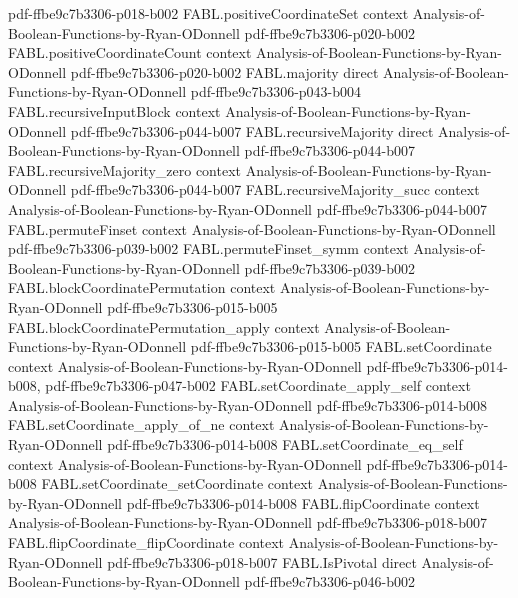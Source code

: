 \begin{theorem}
  {pdf-ffbe9c7b3306-p018-b002}
\proofstep
  {FABL.positiveCoordinateSet}
  {context}
  {Analysis-of-Boolean-Functions-by-Ryan-ODonnell}
  {pdf-ffbe9c7b3306-p020-b002}
\proofstep
  {FABL.positiveCoordinateCount}
  {context}
  {Analysis-of-Boolean-Functions-by-Ryan-ODonnell}
  {pdf-ffbe9c7b3306-p020-b002}
\proofstep
  {FABL.majority}
  {direct}
  {Analysis-of-Boolean-Functions-by-Ryan-ODonnell}
  {pdf-ffbe9c7b3306-p043-b004}
\proofstep
  {FABL.recursiveInputBlock}
  {context}
  {Analysis-of-Boolean-Functions-by-Ryan-ODonnell}
  {pdf-ffbe9c7b3306-p044-b007}
\proofstep
  {FABL.recursiveMajority}
  {direct}
  {Analysis-of-Boolean-Functions-by-Ryan-ODonnell}
  {pdf-ffbe9c7b3306-p044-b007}
\proofstep
  {FABL.recursiveMajority_zero}
  {context}
  {Analysis-of-Boolean-Functions-by-Ryan-ODonnell}
  {pdf-ffbe9c7b3306-p044-b007}
\proofstep
  {FABL.recursiveMajority_succ}
  {context}
  {Analysis-of-Boolean-Functions-by-Ryan-ODonnell}
  {pdf-ffbe9c7b3306-p044-b007}
\proofstep
  {FABL.permuteFinset}
  {context}
  {Analysis-of-Boolean-Functions-by-Ryan-ODonnell}
  {pdf-ffbe9c7b3306-p039-b002}
\proofstep
  {FABL.permuteFinset_symm}
  {context}
  {Analysis-of-Boolean-Functions-by-Ryan-ODonnell}
  {pdf-ffbe9c7b3306-p039-b002}
\proofstep
  {FABL.blockCoordinatePermutation}
  {context}
  {Analysis-of-Boolean-Functions-by-Ryan-ODonnell}
  {pdf-ffbe9c7b3306-p015-b005}
\proofstep
  {FABL.blockCoordinatePermutation_apply}
  {context}
  {Analysis-of-Boolean-Functions-by-Ryan-ODonnell}
  {pdf-ffbe9c7b3306-p015-b005}
\proofstep
  {FABL.setCoordinate}
  {context}
  {Analysis-of-Boolean-Functions-by-Ryan-ODonnell}
  {pdf-ffbe9c7b3306-p014-b008,
    pdf-ffbe9c7b3306-p047-b002}
\proofstep
  {FABL.setCoordinate_apply_self}
  {context}
  {Analysis-of-Boolean-Functions-by-Ryan-ODonnell}
  {pdf-ffbe9c7b3306-p014-b008}
\proofstep
  {FABL.setCoordinate_apply_of_ne}
  {context}
  {Analysis-of-Boolean-Functions-by-Ryan-ODonnell}
  {pdf-ffbe9c7b3306-p014-b008}
\proofstep
  {FABL.setCoordinate_eq_self}
  {context}
  {Analysis-of-Boolean-Functions-by-Ryan-ODonnell}
  {pdf-ffbe9c7b3306-p014-b008}
\proofstep
  {FABL.setCoordinate_setCoordinate}
  {context}
  {Analysis-of-Boolean-Functions-by-Ryan-ODonnell}
  {pdf-ffbe9c7b3306-p014-b008}
\proofstep
  {FABL.flipCoordinate}
  {context}
  {Analysis-of-Boolean-Functions-by-Ryan-ODonnell}
  {pdf-ffbe9c7b3306-p018-b007}
\proofstep
  {FABL.flipCoordinate_flipCoordinate}
  {context}
  {Analysis-of-Boolean-Functions-by-Ryan-ODonnell}
  {pdf-ffbe9c7b3306-p018-b007}
\proofstep
  {FABL.IsPivotal}
  {direct}
  {Analysis-of-Boolean-Functions-by-Ryan-ODonnell}
  {pdf-ffbe9c7b3306-p046-b002}

\end{theorem}
